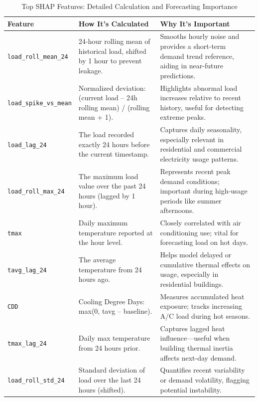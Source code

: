 \documentclass[final,numbered]{ifacconf}
\begin{document}
\clearpage
\begin{table}[p]
\centering
\small
\centering
\small
\caption{Top SHAP Features: Detailed Calculation and Forecasting Importance}

\begin{adjustbox}{width=\textwidth}
\begin{tabular}{|p{4cm}|p{6cm}|p{6cm}|}
\hline
\textbf{Feature} & \textbf{How It's Calculated} & \textbf{Why It's Important} \\
\hline
\texttt{load\_roll\_mean\_24} & 24-hour rolling mean of historical load, shifted by 1 hour to prevent leakage. & Smooths hourly noise and provides a short-term demand trend reference, aiding in near-future predictions. \\
\hline
\texttt{load\_spike\_vs\_mean} & Normalized deviation: (current load – 24h rolling mean) / (rolling mean + 1). & Highlights abnormal load increases relative to recent history, useful for detecting extreme peaks. \\
\hline
\texttt{load\_lag\_24} & The load recorded exactly 24 hours before the current timestamp. & Captures daily seasonality, especially relevant in residential and commercial electricity usage patterns. \\
\hline
\texttt{load\_roll\_max\_24} & The maximum load value over the past 24 hours (lagged by 1 hour). & Represents recent peak demand conditions; important during high-usage periods like summer afternoons. \\
\hline
\texttt{tmax} & Daily maximum temperature reported at the hour level. & Closely correlated with air conditioning use; vital for forecasting load on hot days. \\
\hline
\texttt{tavg\_lag\_24} & The average temperature from 24 hours ago. & Helps model delayed or cumulative thermal effects on usage, especially in residential buildings. \\
\hline
\texttt{CDD} & Cooling Degree Days: max(0, tavg – baseline). & Measures accumulated heat exposure; tracks increasing A/C load during hot seasons. \\
\hline
\texttt{tmax\_lag\_24} & Daily max temperature from 24 hours prior. & Captures lagged heat influence—useful when building thermal inertia affects next-day demand. \\
\hline
\texttt{load\_roll\_std\_24} & Standard deviation of load over the last 24 hours (shifted). & Quantifies recent variability or demand volatility, flagging potential instability. \\
\hline

\end{tabular}
\end{adjustbox}
\end{table}
\end{document}
